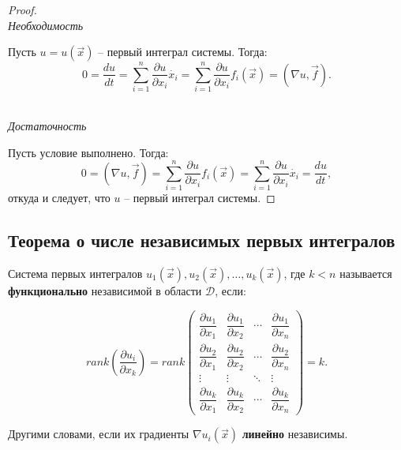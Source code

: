 	\begin{proof}
		\hfill\\
		\textit{Необходимость}
		
		Пусть $u = u(\vec{x})$ -- первый интеграл системы. Тогда:
		\begin{equation}
			0 = \frac{du}{dt} = \sum\limits_{i = 1}^n \frac{\partial u}{\partial x_i}\dot{x_i} = \sum\limits_{i = 1}^n \frac{\partial u}{\partial x_i} f_i(\vec{x}) = (\nabla u, \vec{f}).
		\end{equation}
	
		\hfill\\
		\textit{Достаточность}
		
		Пусть условие выполнено. Тогда:
		\begin{equation}
			0 = (\nabla u, \vec{f}) = \sum\limits_{i = 1}^n \frac{\partial u}{\partial x_i} f_i(\vec{x}) = \sum\limits_{i = 1}^n \frac{\partial u}{\partial x_i}\dot{x_i} = \frac{du}{dt},
		\end{equation}
		откуда и следует, что $u$ -- первый интеграл системы.
	\end{proof}

	\subsection{Теорема о числе независимых первых интегралов}
	
	\begin{definition}
		Система первых интегралов $u_1(\vec{x}), u_2(\vec{x}), \ldots, u_k(\vec{x})$, где $k < n$ называется \textbf{функционально} независимой в области $\mathscr{D}$, если:
		
		\begin{equation}
			rank\left(\frac{\partial u_i}{\partial x_k}\right) = rank \begin{pmatrix}
				\dfrac{\partial u_1}{\partial x_1} & \dfrac{\partial u_1}{\partial x_2} & 	\cdots & \dfrac{\partial u_1}{\partial x_n} \\
				\dfrac{\partial u_2}{\partial x_1} & \dfrac{\partial u_2}{\partial x_2} & 	\cdots & \dfrac{\partial u_2}{\partial x_n} \\
				\vdots & \vdots & \ddots & \vdots \\
				\dfrac{\partial u_k}{\partial x_1} & \dfrac{\partial u_k}{\partial x_2} & 	\cdots & \dfrac{\partial u_k}{\partial x_n}
			\end{pmatrix} = k.			
		\end{equation}
	
	
	Другими словами, если их градиенты $\nabla u_i(\vec{x})$ \textbf{линейно} независимы.
	\end{definition}

